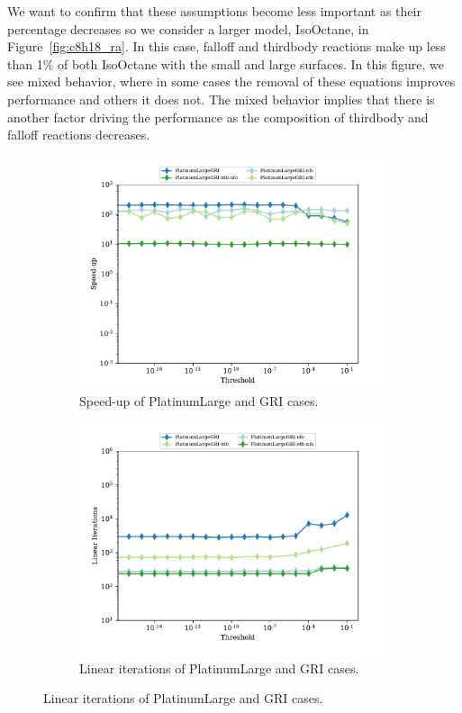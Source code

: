 \documentclass{article}
\begin{document}
We want to confirm that these assumptions become less important as their percentage decreases so we consider a larger model, IsoOctane\cite{mehl_chemical_2009}, in Figure~\ref{fig:c8h18_ra}.
In this case, falloff and thirdbody reactions make up less than 1\% of both IsoOctane with the small and large surfaces.
In this figure, we see mixed behavior, where in some cases the removal of these equations improves performance and others it does not.
The mixed behavior implies that there is another factor driving the performance as the composition of thirdbody and falloff reactions decreases.

\begin{figure}[htb]
    \centering
    \begin{subfigure}{0.49\textwidth}
        \centering
        \includegraphics[width=\textwidth]{figures/speedup-gri-large-network_combustor_exhaust.pdf}
        \caption{Speed-up of PlatinumLarge and GRI cases.}
        \label{fig:gri_large_su}
    \end{subfigure}
    \hfill
    \begin{subfigure}{0.49\textwidth}
        \centering
        \includegraphics[width=\textwidth]{figures/lin_iters_gri_large.pdf}
        \caption{Linear iterations of PlatinumLarge and GRI cases.}
        \label{fig:gri_large_cond}
    \end{subfigure}
    \hfill


\end{figure}
\end{document}
